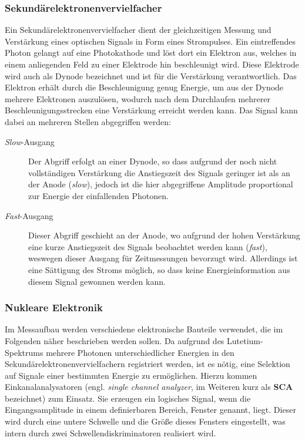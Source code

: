 \documentclass[11pt, a4paper]{article}
\numberwithin{equation}{section}
\begin{document}
\subsubsection{Sekundärelektronenvervielfacher}

Ein Sekundärelektronenvervielfacher dient der gleichzeitigen Messung und Verstärkung eines optischen Signals in Form eines Strompulses.
Ein eintreffendes Photon gelangt auf eine Photokathode und löst dort ein Elektron aus, welches in einem anliegenden Feld zu einer Elektrode hin beschleunigt wird.
Diese Elektrode wird auch als Dynode bezeichnet und ist für die Verstärkung verantwortlich.
Das Elektron erhält durch die Beschleunigung genug Energie, um aus der Dynode mehrere Elektronen auszulösen, wodurch nach dem Durchlaufen mehrerer Beschleunigungsstrecken eine Verstärkung erreicht werden kann.
Das Signal kann dabei an mehreren Stellen abgegriffen werden:
\begin{description}
	\item[\textit{Slow}-Ausgang]Der Abgriff erfolgt an einer Dynode, so dass aufgrund der noch nicht vollständigen Verstärkung die Anstiegszeit des Signals geringer ist als an der Anode (\textit{slow}), jedoch ist die hier abgegriffene Amplitude proportional zur Energie der einfallenden Photonen.
	\item[\textit{Fast}-Ausgang]Dieser Abgriff geschieht an der Anode, wo aufgrund der hohen Verstärkung eine kurze Anstiegszeit des Signals beobachtet werden kann (\textit{fast}), weswegen dieser Ausgang für Zeitmessungen bevorzugt wird. Allerdings ist eine Sättigung des Stroms möglich, so dass keine Energieinformation aus diesem Signal gewonnen werden kann.
\end{description}

\subsubsection{Nukleare Elektronik}

Im Messaufbau werden verschiedene elektronische Bauteile verwendet, die im Folgenden näher beschrieben werden sollen.
Da aufgrund des Lutetium-Spektrums mehrere Photonen unterschiedlicher Energien in den Sekundärelektronenvervielfachern registriert werden, ist es nötig, eine Selektion auf Signale einer bestimmten Energie zu ermöglichen.
Hierzu kommen Einkanalanalysatoren (engl. \textit{single channel analyzer}, im Weiteren kurz als \textbf{SCA} bezeichnet) zum Einsatz.
Sie erzeugen ein logisches Signal, wenn die Eingangsamplitude in einem definierbaren Bereich, Fenster genannt, liegt.
Dieser wird durch eine untere Schwelle und die Größe dieses Fensters eingestellt, was intern durch zwei Schwellendiskriminatoren realisiert wird.
\end{document}

